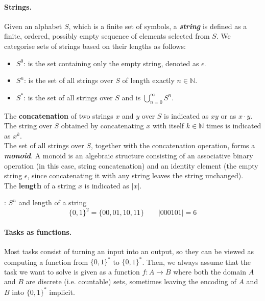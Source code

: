 \documentclass{article}
\begin{document}
			\paragraph{Strings.}
			\mbox{}
			\vspace{0.1cm}
	
			Given an alphabet $S$, which is a finite set of symbols, a \textbf{\textit{string}} is defined as a finite, ordered, possibly empty sequence of elements selected from $S$. We categorise sets of strings based on their lengths as follows:
			\begin{itemize}
    			\item $S^0$: is the set containing only the empty string, denoted as $\epsilon$.
    			\item $S^n$: is the set of all strings over $S$ of length exactly $n\in\mathbb{N}$.
    			\item $S^*$: is the set of all strings over $S$ and is $\bigcup_{n=0}^\infty S^n$.
			\end{itemize}
			The \textbf{concatenation} of two strings $x$ and $y$ over $S$ is indicated as $xy$ or as $x\cdot y$. The string over $S$ obtained by concatenating $x$ with itself $k\in \mathbb{N}$ times is indicated as $x^k$.\\
			The set of all strings over $S$, together with the concatenation operation, forms a \textbf{\textit{monoid}}. A monoid is an algebraic structure consisting of an associative binary operation (in this case, string concatenation) and an identity element (the empty string $\epsilon$, since concatenating it with any string leaves the string unchanged).\\
			The \textbf{length} of a string $x$ is indicated as $\left\lvert x\right\rvert$.
			\vspace{0.1cm}
			\begin{example}{: $S^n$ and length of a string}
    			$$\{0,1\}^2=\{00,01,10,11\}\qquad \left\lvert 000101\right\rvert=6$$
			\end{example}
			\paragraph{Tasks as functions.}
			\mbox{}
			\vspace{0.1cm}
	
			Most tasks consist of turning an input into an output, so they can be viewed as computing a function from $\{0,1\}^*$ to $\{0,1\}^*$. Then, we always assume that the task we want to solve is given as a function $f: A \rightarrow B$ where both the domain $A$ and $B$ are discrete (i.e. countable) sets, sometimes leaving the encoding of $A$ and $B$ into $\{0,1\}^*$ implicit.
			\vspace{0.15cm}
			
\end{document}
